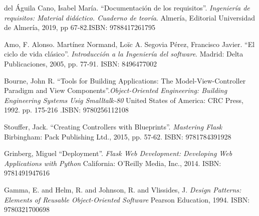 \documentclass[11pt,spanish,listoffigures,listoftables]{tfgetsinf}
\begin{document}
\begin{thebibliography}{10}



	del Águila Cano, Isabel María.
	\newblock ``Documentación de los requisitos''. \textit{Ingeniería de requisitos: Material didáctico. Cuaderno de teoría}.
	\newblock Almería, Editorial Universidad de Almería, 2019, pp 67-82.ISBN: 9788417261795

	Amo, F. Alonso. Martínez Normand, Loïc A. Segovia Pérez, Francisco Javier.
	\newblock ``El ciclo de vida clásico''. \textit{Introducción a la Ingeniería del software}.
	\newblock Madrid: Delta Publicaciones, 2005, pp. 77-91. ISBN: 8496477002
	
	Bourne, John R.
	\newblock ``Tools for Building Applications: The Model-View-Controller Paradigm and View Components''.\textit{Object-Oriented Engineering: Building Engineering Systems Usig Smalltalk-80}
	\newblock United States of America: CRC Press, 1992. pp. 175-216 .ISBN: 9780256112108
	
	Stouffer, Jack.
	\newblock ``Creating Controllers with Blueprints''. \textit{Mastering Flask}
	\newblock Birbingham: Pack Publishing Ltd., 2015, pp. 57-62. ISBN: 9781784391928
	
	
	Grinberg, Miguel
	\newblock ``Deployment''. \textit{Flask Web Development: Developing Web Applications with Python}
	\newblock California: O'Reilly Media, Inc., 2014. ISBN: 9781491947616
	
	Gamma, E. and Helm, R. and Johnson, R. and Vlissides, J.
	\newblock \textit{Design Patterns: Elements of Reusable Object-Oriented Software}
	\newblock Pearson Education, 1994. ISBN: 9780321700698
	



\end{thebibliography}
\end{document}
